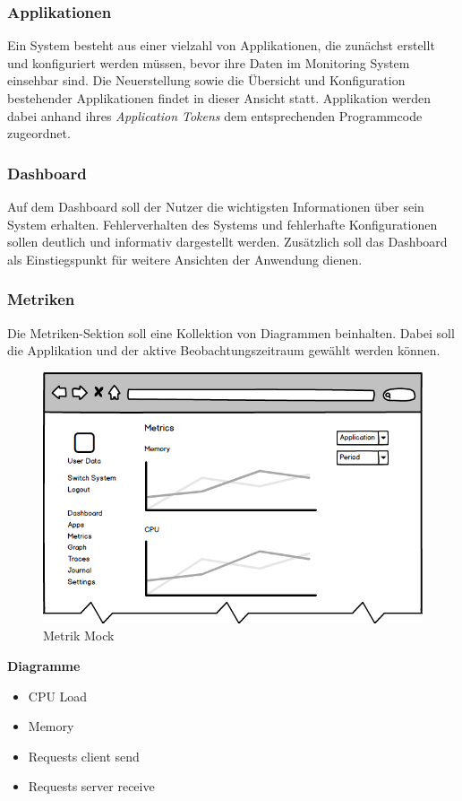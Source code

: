 \subsubsection{Applikationen}

Ein System besteht aus einer vielzahl von Applikationen, die zunächst  erstellt und
konfiguriert werden müssen, bevor ihre Daten im Monitoring System einsehbar sind.
Die Neuerstellung sowie die Übersicht und Konfiguration bestehender Applikationen
findet in dieser Ansicht statt.
Applikation werden dabei anhand ihres \emph{Application Tokens} dem entsprechenden
Programmcode zugeordnet.

\subsubsection{Dashboard}

Auf dem Dashboard soll der Nutzer die wichtigsten Informationen über sein System erhalten.
Fehlerverhalten des Systems und fehlerhafte Konfigurationen sollen deutlich und informativ dargestellt werden.
Zusätzlich soll das Dashboard als Einstiegspunkt für weitere Ansichten der Anwendung dienen.

\subsubsection{Metriken}

Die Metriken-Sektion soll eine Kollektion von Diagrammen beinhalten.
Dabei soll die Applikation und der aktive Beobachtungszeitraum gewählt werden können.

\begin{figure}[h]
 \centering
 \includegraphics[width=0.6\linewidth]{kapitel1/mocks/metrics.png}
 \caption{Metrik Mock}
  \label{fig:metrics}
\end{figure}

\textbf{Diagramme}

\begin{itemize}
\item CPU Load
\item Memory
\item Requests client send
\item Requests server receive
\end{itemize}



